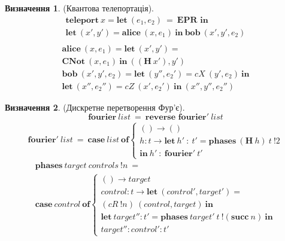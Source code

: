 \documentclass{article}
\theoremstyle{definition}
\newtheorem{definition}{Визначення}
\begin{document}
\begin{definition} (Квантова телепортація).
\begin{multline}
\textbf{teleport}\ x = \textbf{let}\ (e_1,e_2)\ =\ \textbf{EPR in} \\
\textbf{let}\ (x',y') = \textbf{alice}\ (x,e_1)\ \textbf{in}\ \textbf{bob}\ (x',y',e_2) \\
\end{multline}
\begin{multline}
\textbf{alice}\ (x,e_1) = \textbf{let}\ (x',y') = \\
\textbf{CNot}\ (x,e_1)\ \textbf{in}\ ((\textbf{H}\ x'),y') \\
\textbf{bob}\ (x',y',e_2) = \textbf{let}\ (y'',e_2') = cX\ (y',e_2)\ \textbf{in} \\
\textbf{let}\ (x'',e_2'') = cZ\ (x',e_2')\ \textbf{in}\ (x'',y'',e_2'')
\end{multline}
\end{definition}

\begin{definition} (Дискретне перетворення Фур'є).
\begin{equation}
\textbf{fourier}\ list\ =\ \textbf{reverse fourier}'\ list
\end{equation}
\begin{multline}
\textbf{fourier}'\ list\ =
\ \textbf{case}\ list\ \textbf{of}
\begin{cases}
() \rightarrow () \\
h : t \rightarrow \textbf{let}\ h'\ :\ t' = \textbf{phases}\ (\textbf{H}\ h)\ t\ !2 \\
\textbf{in}\ h'\ :\ \textbf{fourier}'\ t'
\end{cases}
\end{multline}
\begin{multline}
\textbf{phases}\ target\ controls\ !n\ = \\
\textbf{case}\ control\ \textbf{of}
\begin{cases}
() \rightarrow target \\
control : t \rightarrow \textbf{let}\ (control',target') = \\
(cR\ !n)\ (control, target)\ \textbf{in} \\
\textbf{let}\ target'' : t' = \textbf{phases}\ target'\ t\ !(\textbf{succ}\ n)\ \textbf{in} \\
target '' : control' : t'
\end{cases}
\end{multline}
\end{definition}
\end{document}
